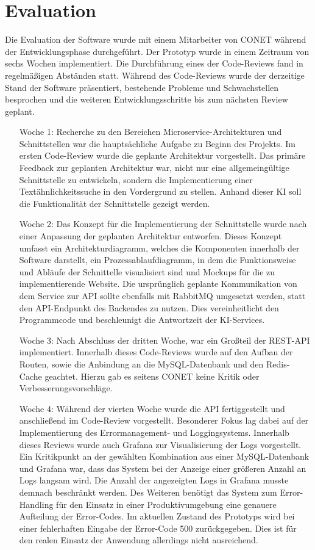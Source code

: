 \section{Evaluation}
Die Evaluation der Software wurde mit einem Mitarbeiter von CONET während der Entwicklungsphase durchgeführt. Der Prototyp wurde in einem Zeitraum von sechs Wochen implementiert. Die Durchführung eines der Code-Reviews fand in regelmäßigen Abständen statt. Während des Code-Reviews wurde der derzeitige Stand der Software präsentiert, bestehende Probleme und Schwachstellen besprochen und die weiteren Entwicklungsschritte bis zum nächsten Review geplant.

\begin{itemize}[leftmargin=6em]
\item [Woche 1:] Recherche zu den Bereichen Microservice-Architekturen und Schnittstellen war die hauptsächliche Aufgabe zu Beginn des Projekts. Im ersten Code-Review wurde die geplante Architektur vorgestellt. Das primäre Feedback zur geplanten Architektur war, nicht nur eine allgemeingültige Schnittstelle zu entwickeln, sondern die Implementierung einer Textähnlichkeitssuche in den Vordergrund zu stellen. Anhand dieser KI soll die Funktionalität der Schnittstelle gezeigt werden.
\item [Woche 2:] Das Konzept für die Implementierung der Schnittstelle wurde nach einer Anpassung der geplanten Architektur entworfen. Dieses Konzept umfasst ein Architekturdiagramm, welches die Komponenten innerhalb der Software darstellt, ein Prozessablaufdiagramm, in dem die Funktionsweise und Abläufe der Schnittelle visualisiert sind und Mockups für die zu implementierende Website. Die ursprünglich geplante Kommunikation von dem Service zur API sollte ebenfalls mit RabbitMQ umgesetzt werden, statt den API-Endpunkt des Backendes zu nutzen. Dies vereinheitlicht den Programmcode und beschleunigt die Antwortzeit der KI-Services.
\item [Woche 3:] Nach Abschluss der dritten Woche, war ein Großteil der REST-API implementiert. Innerhalb dieses Code-Reviews wurde auf den Aufbau der Routen, sowie die Anbindung an die MySQL-Datenbank und den Redis-Cache geachtet. Hierzu gab es seitens CONET keine Kritik oder Verbesserungsvorschläge.
\item [Woche 4:] Während der vierten Woche wurde die API fertiggestellt und anschließend im Code-Review vorgestellt. Besonderer Fokus lag dabei auf der Implementierung des Errormanagement- und Loggingsystems. Innerhalb dieses Reviews wurde auch Grafana zur Visualisierung der Logs vorgestellt. Ein Kritikpunkt an der gewählten Kombination aus einer MySQL-Datenbank und Grafana war, dass das System bei der Anzeige einer größeren Anzahl an Logs langsam wird. Die Anzahl der angezeigten Logs in Grafana musste demnach beschränkt werden. Des Weiteren benötigt das System zum Error-Handling für den Einsatz in einer Produktivumgebung eine genauere Aufteilung der Error-Codes. Im aktuellen Zustand des Prototyps wird bei einer fehlerhaften Eingabe der Error-Code 500 zurückgegeben. Dies ist für den realen Einsatz der Anwendung allerdings nicht ausreichend.

\end{itemize}
